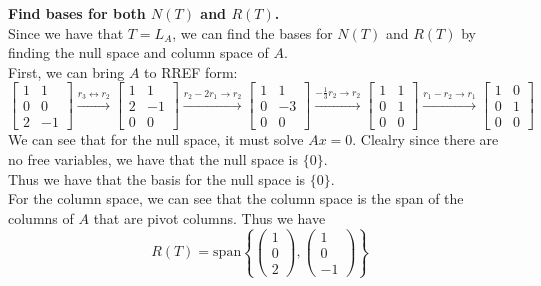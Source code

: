 \documentclass[answers,12pt,addpoints]{exam}
\begin{document}
\textbf{Find bases for both $N(T)$ and $R(T)$.}\\
Since we have that $T = L_A$, we can find the bases for $N(T)$ and $R(T)$ by finding the null space and column space of $A$.\\
First, we can bring $A$ to RREF form:
$$ \begin{bmatrix}
1 & 1 \\ 0 & 0 \\ 2 & -1
\end{bmatrix} \xrightarrow{r_3 \leftrightarrow r_2} \begin{bmatrix}
1 & 1 \\ 2 & -1 \\ 0 & 0
\end{bmatrix} \xrightarrow{r_2 - 2r_1 \to r_2} \begin{bmatrix}
1 & 1 \\ 0 & -3 \\ 0 & 0
\end{bmatrix} \xrightarrow{-\frac{1}{3}r_2 \to r_2} \begin{bmatrix}
1 & 1 \\ 0 & 1 \\ 0 & 0
\end{bmatrix} \xrightarrow{r_1 - r_2 \to r_1} \begin{bmatrix}
1 & 0 \\ 0 & 1 \\ 0 & 0
\end{bmatrix} $$
We can see that for the null space, it must solve $Ax = 0$. Clealry since there are no free variables, we have that the null space is $\{0\}$.\\
Thus we have that the basis for the null space is $\{0\}$.\\
For the column space, we can see that the column space is the span of the columns of $A$ that are pivot columns. Thus we have
$$ R(T) = \text{span} \left\{ \begin{pmatrix}
1 \\ 0 \\ 2
\end{pmatrix}, \begin{pmatrix}
1 \\ 0 \\ -1
\end{pmatrix} \right\} $$
\end{document}
